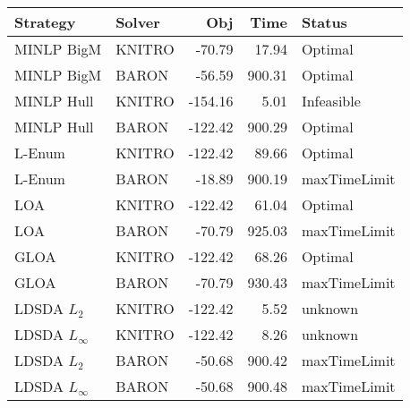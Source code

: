 \begin{tabular}{llrrl}
\toprule
Strategy & Solver & Obj & Time & Status \\
\midrule
MINLP BigM & KNITRO & -70.79 & 17.94 & Optimal \\
MINLP BigM & BARON & -56.59 & 900.31 & Optimal \\
MINLP Hull & KNITRO & -154.16 & 5.01 & Infeasible \\
MINLP Hull & BARON & -122.42 & 900.29 & Optimal \\
L-Enum & KNITRO & -122.42 & 89.66 & Optimal \\
L-Enum & BARON & -18.89 & 900.19 & maxTimeLimit \\
LOA & KNITRO & -122.42 & 61.04 & Optimal \\
LOA & BARON & -70.79 & 925.03 & maxTimeLimit \\
GLOA & KNITRO & -122.42 & 68.26 & Optimal \\
GLOA & BARON & -70.79 & 930.43 & maxTimeLimit \\
LDSDA $L_2$ & KNITRO & -122.42 & 5.52 & unknown \\
LDSDA $L_\infty$ & KNITRO & -122.42 & 8.26 & unknown \\
LDSDA $L_2$ & BARON & -50.68 & 900.42 & maxTimeLimit \\
LDSDA $L_\infty$ & BARON & -50.68 & 900.48 & maxTimeLimit \\
\bottomrule
\end{tabular}
